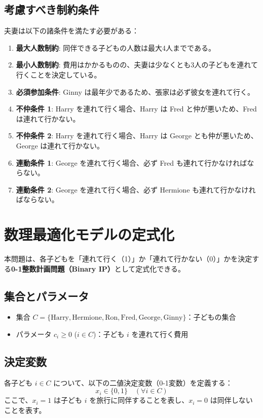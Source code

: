 \documentclass[11pt,a4paper]{ltjsarticle}
\begin{document}
\subsection{考慮すべき制約条件}
夫妻は以下の諸条件を満たす必要がある：
\begin{enumerate}
  \item \textbf{最大人数制約}: 同伴できる子どもの人数は最大4人までである。
  \item \textbf{最小人数制約}: 費用はかかるものの、夫妻は少なくとも3人の子どもを連れて行くことを決定している。
  \item \textbf{必須参加条件}: Ginny は最年少であるため、張家は必ず彼女を連れて行く。
  \item \textbf{不仲条件 1}: Harry を連れて行く場合、Harry は Fred と仲が悪いため、Fred は連れて行かない。
  \item \textbf{不仲条件 2}: Harry を連れて行く場合、Harry は George とも仲が悪いため、George は連れて行かない。
  \item \textbf{連動条件 1}: George を連れて行く場合、必ず Fred も連れて行かなければならない。
  \item \textbf{連動条件 2}: George を連れて行く場合、必ず Hermione も連れて行かなければならない。
\end{enumerate}

\section{数理最適化モデルの定式化}

本問題は、各子どもを「連れて行く（1）」か「連れて行かない（0）」かを決定する\textbf{0-1整数計画問題（Binary IP）}として定式化できる。

\subsection{集合とパラメータ}
\begin{itemize}
  \item 集合 $C = \{\text{Harry}, \text{Hermione}, \text{Ron}, \text{Fred}, \text{George}, \text{Ginny}\}$：子どもの集合
  \item パラメータ $c_i \ge 0$ ($i \in C$)：子ども $i$ を連れて行く費用
\end{itemize}

\subsection{決定変数}
各子ども $i \in C$ について、以下の二値決定変数（0-1変数）を定義する：
\begin{equation}
  x_i \in \{0, 1\} \quad (\forall i \in C)
\end{equation}
ここで、$x_i = 1$ は子ども $i$ を旅行に同伴することを表し、$x_i = 0$ は同伴しないことを表す。
\end{document}
